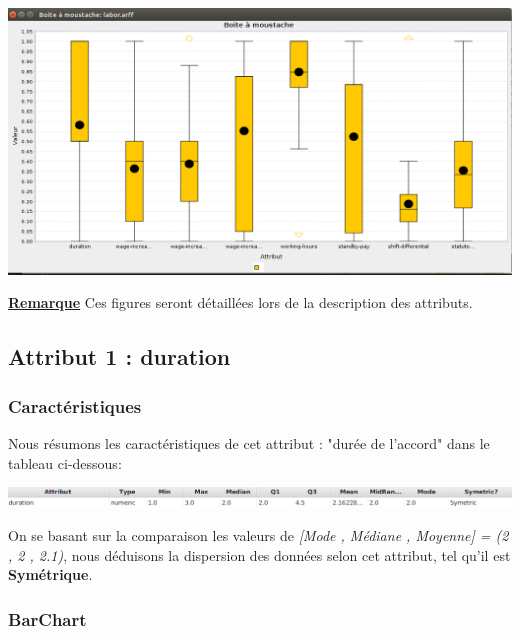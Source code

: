 \documentclass[12pt,a4paper,oneside]{book}
\begin{document}
	\begin{center}
		\includegraphics[width=1\textwidth]{screens/BoxPlotN.png}%
		\label{labelname}%
	\end{center}
	
	\underline{\textbf{Remarque}}
	Ces figures seront détaillées lors de la description des attributs.
	
	\newpage
	
	\subsection{Attribut 1 : duration }
	\subsubsection{Caractéristiques}
	Nous résumons les caractéristiques de cet attribut : "durée de l'accord" dans le tableau ci-dessous:
	\begin{center}
		\includegraphics[width=1\textwidth]{screens/att-1.png}%
		\label{labelname}%
	\end{center}
	On se basant sur la comparaison les valeurs de \textit{[Mode , Médiane , Moyenne] = (2 , 2 , 2.1)}, nous déduisons la dispersion des données selon cet attribut, tel qu'il est \textbf{Symétrique}.
	
	\subsubsection{BarChart}
	
\end{document}
